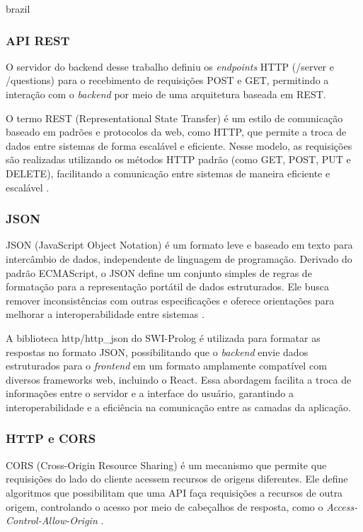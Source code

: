 \begin{otherlanguage*}{brazil}
\subsubsection{API REST}

O servidor do backend desse trabalho definiu os \textit{endpoints} HTTP (/server e /questions) para o recebimento de requisições POST e GET, permitindo a interação com o \textit{backend} por meio de uma arquitetura baseada em REST. 

O termo REST (Representational State Transfer) é um estilo de comunicação baseado em padrões e protocolos da web, como HTTP, que permite a troca de dados entre sistemas de forma escalável e eficiente. Nesse modelo, as requisições são realizadas utilizando os métodos HTTP padrão (como GET, POST, PUT e DELETE), facilitando a comunicação entre sistemas de maneira eficiente e escalável \cite{whatisrest}.

\subsubsection{JSON}

JSON (JavaScript Object Notation) é um formato leve e baseado em texto para intercâmbio de dados, independente de linguagem de programação. Derivado do padrão ECMAScript, o JSON define um conjunto simples de regras de formatação para a representação portátil de dados estruturados. Ele busca remover inconsistências com outras especificações e oferece orientações para melhorar a interoperabilidade entre sistemas \cite{whatisjson}.

A biblioteca http/http\_json do SWI-Prolog é utilizada para formatar as respostas no formato JSON, possibilitando que o \textit{backend} envie dados estruturados para o \textit{frontend} em um formato amplamente compatível com diversos frameworks web, incluindo o React. Essa abordagem facilita a troca de informações entre o servidor e a interface do usuário, garantindo a interoperabilidade e a eficiência na comunicação entre as camadas da aplicação.

\subsubsection{HTTP e CORS}

CORS (Cross-Origin Resource Sharing) é um mecanismo que permite que requisições do lado do cliente acessem recursos de origens diferentes. Ele define algoritmos que possibilitam que uma API faça requisições a recursos de outra origem, controlando o acesso por meio de cabeçalhos de resposta, como o \textit{Access-Control-Allow-Origin} \cite{whatiscors}.


\end{otherlanguage*}
